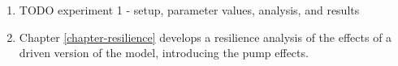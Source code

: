 \begin{enumerate}
    \item TODO experiment 1 - setup, parameter values,  analysis, and results
    \item Chapter \ref{chapter-resilience} develops a resilience analysis of the effects of a driven version of the model, introducing the pump effects.  
\end{enumerate}



